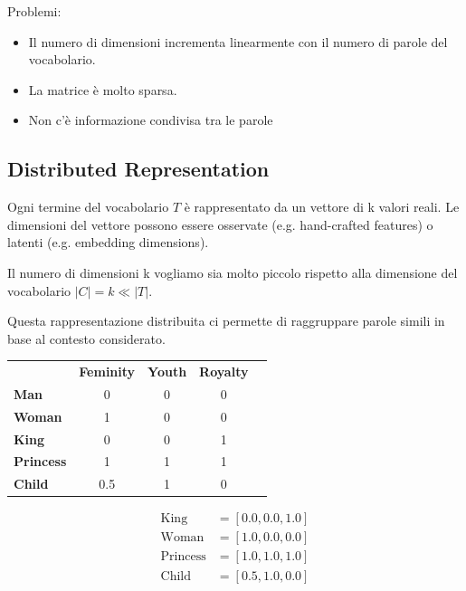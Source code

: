 Problemi:
\begin{itemize}
  \item Il numero di dimensioni incrementa linearmente con il numero di parole del vocabolario.
  \item La matrice è molto sparsa.
  \item Non c'è informazione condivisa tra le parole
\end{itemize}

\subsection*{Distributed Representation}
Ogni termine del vocabolario $T$ è rappresentato da un vettore di k valori reali.
Le dimensioni del vettore possono essere osservate (e.g. hand-crafted features) o latenti (e.g. embedding dimensions).

Il numero di dimensioni k vogliamo sia molto piccolo rispetto alla dimensione del vocabolario $|C| = k \ll |T|$.

Questa rappresentazione distribuita ci permette di raggruppare parole simili in base al contesto considerato.

\begin{minipage}[c]{0.55\linewidth}
  \begin{tabular}{l c c c c}
                                    & {\color{teal} \textbf{Feminity}} & {\color{teal} \textbf{Youth}} & {\color{teal} \textbf{Royalty}} \\
    {\color{red} \textbf{Man}}      & 0                                & 0                             & 0                               \\
    {\color{red} \textbf{Woman}}    & 1                                & 0                             & 0                               \\
    {\color{red} \textbf{King}}     & 0                                & 0                             & 1                               \\
    {\color{red} \textbf{Princess}} & 1                                & 1                             & 1                               \\
    {\color{red} \textbf{Child}}    & 0.5                              & 1                             & 0
  \end{tabular}
\end{minipage}
\hfill
\begin{minipage}[c]{0.3\linewidth}
  \begin{align*}
    \text{King}     & = [0.0, 0.0, 1.0] \\
    \text{Woman}    & = [1.0, 0.0, 0.0] \\
    \text{Princess} & = [1.0, 1.0, 1.0] \\
    \text{Child}    & = [0.5, 1.0, 0.0]
  \end{align*}
\end{minipage}

